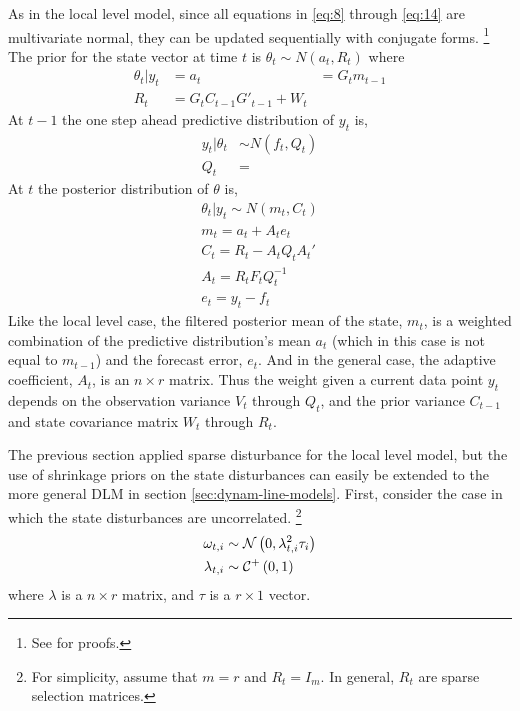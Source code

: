 \documentclass{article}
\begin{document}
As in the local level model, since all equations in \eqref{eq:8} through \eqref{eq:14} are multivariate normal, they can be updated sequentially with conjugate forms.%
\footnote{See \textcite[Section 4.3][]{WestHarrison1997} for proofs.}
The prior for the state vector at time $t$ is $\theta_{t} \sim N(a_{t}, R_{t})$ where
\begin{align}
  \label{eq:13}
  \theta_{t} | y_{t} &= 
  a_{t} &= G_{t} m_{t-1} \\
  R_{t} &= G_{t} C_{t-1} G'_{t-1} + W_{t}
\end{align}
At $t-1$ the one step ahead predictive distribution of $y_{t}$ is,
\begin{align}
  \label{eq:13}
  y_{t} | \theta_{t} & \sim N(f_{t}, Q_{t}) \\
  Q_{t} &= 
\end{align}
At $t$ the posterior distribution of $\theta$ is,
\begin{align}
  \label{eq:15}
  \theta_{t} | y_{t} \sim N(m_{t}, C_{t}) \\
  m_{t} = a_{t} + A_{t} e_{t} \\
  C_{t} = R_{t} - A_{t} Q_{t} A_{t}' \\
  A_{t} = R_{t} F_{t} Q^{-1}_{t} \\
  e_{t} = y_{t} - f_{t}
\end{align}
Like the local level case, the filtered posterior mean of the state,
$m_{t}$, is a weighted combination of the predictive distribution's
mean $a_{t}$ (which in this case is not equal to $m_{t-1}$) and the
forecast error, $e_{t}$.
And in the general case, the adaptive coefficient, $A_{t}$, is an $n
\times r$  matrix.
Thus the weight given a current data point $y_{t}$ depends on the
observation variance $V_{t}$ through $Q_{t}$, and the prior variance
$C_{t-1}$ and state covariance matrix $W_{t}$ through $R_{t}$.


The previous section applied sparse disturbance for the local level model, but the use of shrinkage priors on the state disturbances can easily be extended to the more general DLM in section \ref{sec:dynam-line-models}.
First, consider the case in which the state disturbances are uncorrelated.
\footnote{
  For simplicity, assume that $m = r$ and $R_{t} = I_{m}$.
  In general, $R_{t}$ are sparse selection matrices.
}
\begin{equation}
  \label{eq:20}
  \begin{aligned}[t]
    \omega_{t,i} &\sim \mathcal{N}\left(0, \lambda_{t,i}^{2} \tau_{i}\right) \\
    \lambda_{t,i} & \sim \mathcal{C}^{+}\left(0, 1\right)
  \end{aligned}
\end{equation}
where $\lambda$ is a $n \times r$ matrix, and $\tau$ is a $r \times 1$ vector.
\end{document}
